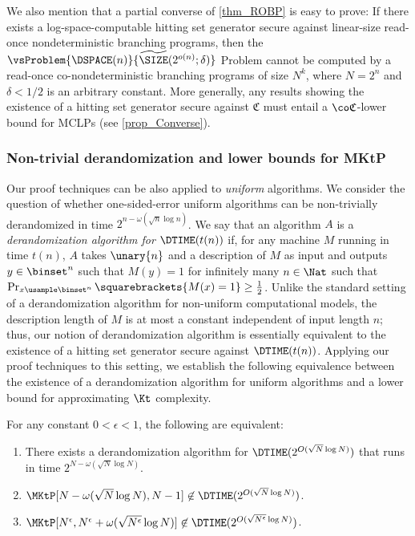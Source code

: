 \documentclass{toc}
\begin{document}
We also mention that
a partial converse of \cref{thm_ROBP} is easy to prove:
If there exists a log-space-computable hitting set generator secure
against linear-size read-once nondeterministic branching programs,
then the $\vsProblem {\DSPACE(n)} { \widetilde{\SIZE}(2^{o(n)}; \delta) }$ Problem
cannot be computed by a read-once co-nondeterministic branching programs
of size $N^k$, where $N = 2^n$ and $\delta < 1 / 2$ is an arbitrary constant.
More generally, any results showing the existence of a hitting set generator
secure against $\mathfrak{C}$
must entail
a $\co \mathfrak{C}$-lower bound for MCLPs
%
(see \cref{prop_Converse}). %

%
%
%
%
%
%
%
%
%
%
%
%
%
%
%

\subsubsection{Non-trivial derandomization and lower bounds for MKtP}

Our proof techniques can be also applied to \emph{uniform} algorithms.
We consider the question of whether one-sided-error uniform algorithms can be non-trivially derandomized in time $2^{n - \omega(\sqrt{n} \log n)}$.
We say that an algorithm $A$ is a \emph{derandomization algorithm for $\DTIME(t(n))$} if,
for any machine $M$ running in time $t(n)$,
$A$ takes $\unary{n}$ and a description of $M$ as input
and
outputs $y \in \binset^n$ such that $M(y) = 1$
for infinitely many $n \in \Nat$ such that
$\Pr_{x \usample \binset^n} \squarebrackets{ M(x) = 1 } \ge \frac{1}{2}$.
Unlike the standard setting of a derandomization algorithm for non-uniform computational models,
the description length of $M$ is at most a constant independent of input length $n$; thus, our notion of derandomization algorithm is essentially equivalent
to the existence of a hitting set generator secure against $\DTIME(t(n))$.
Applying our proof techniques to this setting,
we establish the following equivalence between the existence of a derandomization algorithm for uniform algorithms and
a lower bound for approximating $\Kt$ complexity.


\begin{theorem}
  \label{thm_NontrivialDerandomizationInformal}
  For any constant $0 < \epsilon < 1$,
  the following are equivalent:
  \begin{enumerate}
    \item
          There exists a derandomization algorithm for $\DTIME(2^{O(\sqrt{N} \log N)})$ that runs in time $2^{N - \omega( \sqrt{N} \log N )}$.
    \item
          $\MKtP[N - \omega( \sqrt{N} \log N ), N-1] \not\in \DTIME(2^{O( \sqrt{N} \log N )})$.
    \item
          $\MKtP[N^{\epsilon}, N^{\epsilon} + \omega( \sqrt{N^{\epsilon}} \log N )] \not\in \DTIME(2^{O( \sqrt{N^{\epsilon}} \log N )})$.
  \end{enumerate}
\end{theorem}
\end{document}
